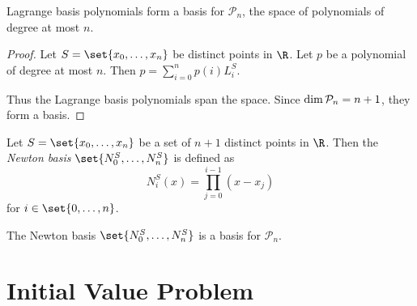 \documentclass[12pt]{article}
\begin{document}
\begin{corollary}
    Lagrange basis polynomials form a basis for $\mathcal{P}_n$, the space of
    polynomials of degree at most $n$.
\end{corollary}
\begin{proof}
    Let $S = \set{x_0, \dots, x_n}$ be distinct points in $\R$.
    Let $p$ be a polynomial of degree at most $n$.
    Then $p = \sum_{i=0}^n p(i) L_i^S$.

    Thus the Lagrange basis polynomials span the space.
    Since $\operatorname{dim} \mathcal{P}_n = n + 1$, they form a basis.
\end{proof}
\begin{definition} \label{def:interpolation:newton_basis}
    Let $S = \set{x_0, \dots, x_n}$ be a set of $n + 1$ distinct points in $\R$.
    Then the \emph{Newton basis} $\set{N_0^S, \dots, N_n^S}$ is defined as \[
        N_i^S(x) = \prod_{j = 0}^{i-1} (x - x_j)
    \] for $i \in \set{0, \dots, n}$.
\end{definition}
\begin{theorem} \label{thm:interpolation:newton_basis}
    The Newton basis $\set{N_0^S, \dots, N_n^S}$ is a basis for $\mathcal{P}_n$.
\end{theorem}

\section{Initial Value Problem} \label{sec:ivp}
\end{document}
